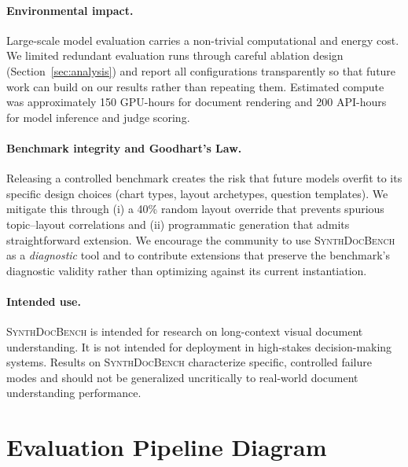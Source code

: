 \documentclass{article} %
\begin{document}
\paragraph{Environmental impact.}
Large-scale model evaluation carries a non-trivial computational and energy cost. We
limited redundant evaluation runs through careful ablation design (Section~\ref{sec:analysis})
and report all configurations transparently so that future work can build on our
results rather than repeating them. Estimated compute was approximately 150 GPU-hours
for document rendering and 200 API-hours for model inference and judge scoring.

\paragraph{Benchmark integrity and Goodhart's Law.}
Releasing a controlled benchmark creates the risk that future models overfit to its
specific design choices (chart types, layout archetypes, question templates). We
mitigate this through (i) a 40\% random layout override that prevents spurious
topic--layout correlations and (ii) programmatic generation that admits straightforward
extension. We encourage the community to use \textsc{SynthDocBench} as a
\emph{diagnostic} tool and to contribute extensions that preserve the benchmark's
diagnostic validity rather than optimizing against its current instantiation.

\paragraph{Intended use.}
\textsc{SynthDocBench} is intended for research on long-context visual document
understanding. It is not intended for deployment in high-stakes decision-making
systems. Results on \textsc{SynthDocBench} characterize specific, controlled failure
modes and should not be generalized uncritically to real-world document understanding
performance.





\appendix

\section{Evaluation Pipeline Diagram}
\label{app:eval_pipeline}
\end{document}
